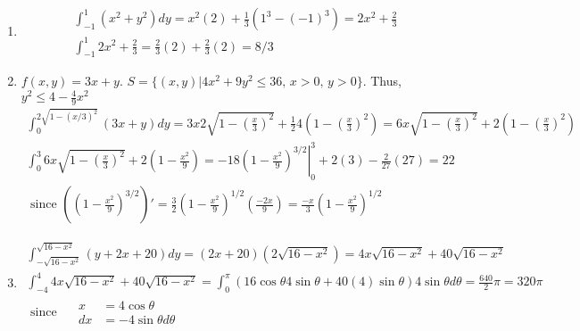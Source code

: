 \documentclass[twoside]{amsart}
\theoremstyle{plain}
\theoremstyle{definition}
\newcommand{\exercisehead}[1]
  {
   \noindent{\small\bf Exercise #1.}
   \smallskip}
\begin{document}
\exercisehead{8}\begin{enumerate}
\item \[
\begin{gathered}
  \int_{-1}^1 (x^2 + y^2) dy = x^2 (2) + \frac{1}{3} (1^3 - (-1)^3) = 2x^2 + \frac{2}{3} \\ 
  \int_{-1}^1 2x^2 + \frac{2}{3} = \frac{2}{3} (2) + \frac{2}{3} (2) = \boxed{ 8/3} 
\end{gathered}
\]
\item $f(x,y) = 3x + y$.  $S = \{ (x,y) | 4x^2 + 9y^2 \leq 36, \, x > 0, \, y > 0 \}$.  Thus, $y^2 \leq 4 - \frac{4}{9} x^2$
\[
\begin{gathered}
  \int_0^{2\sqrt{ 1 - (x/3)^2}} (3x+ y)dy = 3x 2\sqrt{ 1 - \left( \frac{x}{3} \right)^2} + \frac{1}{2} 4 (1- \left( \frac{x}{3} \right)^2 ) = 6x \sqrt{ 1 - \left( \frac{x}{3} \right)^2 } + 2 ( 1 - \left( \frac{x}{3} \right)^2 ) \\
\int_0^3 6x \sqrt{ 1- \left( \frac{x}{3} \right)^2 } + 2 (1 - \frac{x^2}{9} ) = \left. -18 (1- \frac{x^2}{9} )^{3/2} \right|_0^3 + 2 (3) - \frac{2}{27} (27) = \boxed{ 22 } \\
\text{ since } ((1- \frac{x^2}{9} )^{3/2} )' = \frac{3}{2} ( 1 - \frac{x^2}{9} )^{1/2} (\frac{-2x}{9} ) = \frac{-x}{3}(1-\frac{x^2}{9} )^{1/2}
\end{gathered}
\] 
\item \[
\begin{gathered}
  \int_{-\sqrt{ 16 - x^2}}^{\sqrt{ 16 - x^2}} (y+2 x + 20) dy = (2x+ 20) (2\sqrt{ 16 - x^2}) = 4x \sqrt{ 16 - x^2} + 40 \sqrt{ 16 - x^2} \\
  \int_{-4}^4 4 x \sqrt{ 16 - x^2} + 40 \sqrt{ 16 - x^2} = \int_0^{\pi} (16 \cos{\theta} 4 \sin{\theta} + 40 (4) \sin{\theta}) 4 \sin{\theta} d\theta = \frac{640}{2} \pi = \boxed{ 320 \pi } \\
  \text{ since } \quad 
\begin{aligned}
  x & = 4 \cos{\theta} \\
  dx & = -4 \sin{\theta} d\theta
\end{aligned}
\end{gathered}
\]
\end{enumerate}
\end{document}
